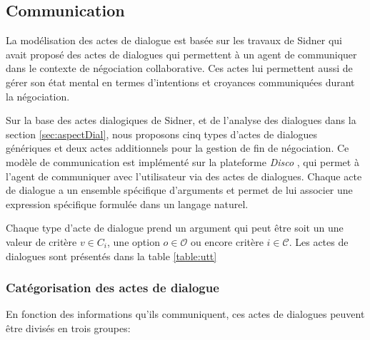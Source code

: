 \subsection{Communication}
\label{sec:communication}


La modélisation des actes de dialogue est basée sur les travaux de Sidner \cite{sidner1994artificial} qui avait proposé des actes de dialogues qui permettent à un agent de communiquer dans le contexte de négociation collaborative. Ces actes lui permettent aussi de gérer son état mental en termes d'intentions et croyances communiquées durant la négociation. 

Sur la base des actes dialogiques de Sidner, et de l'analyse des dialogues dans la section \ref{sec:aspectDial}, nous proposons cinq types d'actes de dialogues génériques et deux actes additionnels pour la gestion de fin de négociation. 
Ce modèle de communication est implémenté sur la plateforme \emph{Disco} \cite{rich09}, qui permet à l'agent de communiquer avec l'utilisateur via des actes de dialogues. Chaque acte de dialogue a un ensemble spécifique d'arguments et permet de lui associer une expression spécifique formulée dans un langage naturel.

Chaque type d'acte de dialogue prend un argument qui peut être soit un une valeur de critère  $v \in C_i$, une option $o \in \mathcal{O}$ ou encore critère $i \in \mathcal{C}$. 
Les actes de dialogues sont présentés dans la table \ref{table:utt}

\subsubsection{Catégorisation des actes de dialogue}

En fonction des informations qu'ils communiquent, ces actes de dialogues peuvent être divisés en trois groupes:

